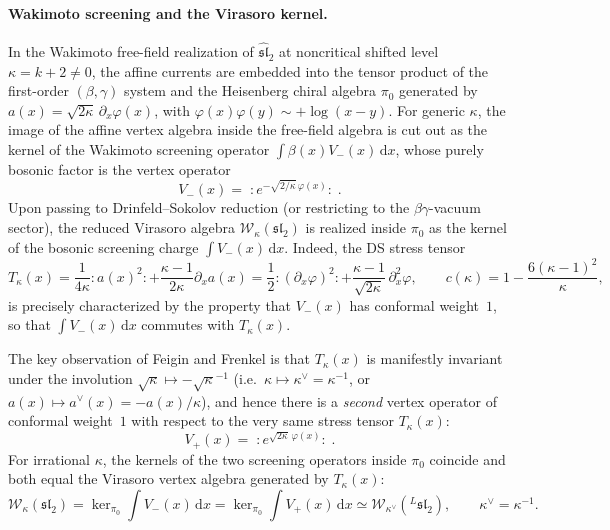 \documentclass[a4paper,11pt]{article}
\newcommand{\dd}{\mathrm{d}}
\numberwithin{equation}{section}
\begin{document}
\paragraph{Wakimoto screening and the Virasoro kernel.}
In the Wakimoto free-field realization of $\widehat{\mathfrak{sl}}_{2}$ at noncritical shifted level $\kappa=k+2\neq 0$, the affine currents are embedded into the tensor product of the first-order $(\beta,\gamma)$ system and the Heisenberg chiral algebra $\pi_{0}$ generated by $a(x)=\sqrt{2\kappa}\,\partial_{x}\varphi(x)$, with $\varphi(x)\varphi(y)\sim +\log(x-y)$. For generic $\kappa$, the image of the affine vertex algebra inside the free-field algebra is cut out as the kernel of the Wakimoto screening operator $\int \beta(x)V_{-}(x)\,\dd x$, whose purely bosonic factor is the vertex operator
\begin{equation}
	\label{equation:PII Frenkel magnetic screening}
	V_{-}(x)=\;:e^{-\sqrt{2/\kappa}\,\varphi(x)}:\;.
\end{equation}
Upon passing to Drinfeld--Sokolov reduction (or restricting to the $\beta\gamma$-vacuum sector), the reduced Virasoro algebra $\mathcal{W}_{\kappa}(\mathfrak{sl}_{2})$ is realized inside $\pi_{0}$ as the kernel of the bosonic screening charge $\int V_{-}(x)\,\dd x$. Indeed, the DS stress tensor
\begin{equation}
	\label{equation:PII Frenkel Virasoro}
	T_{\kappa}(x)
	=\frac{1}{4\kappa}:a(x)^{2}:+\frac{\kappa-1}{2\kappa}\partial_{x}a(x)
	=\frac{1}{2}:(\partial_{x}\varphi)^{2}:+\frac{\kappa-1}{\sqrt{2\kappa}}\,\partial_{x}^{2}\varphi,
	\qquad
	c(\kappa)=1-\frac{6(\kappa-1)^{2}}{\kappa},
\end{equation}
is precisely characterized by the property that $V_{-}(x)$ has conformal weight~$1$, so that $\int V_{-}(x)\,\dd x$ commutes with $T_{\kappa}(x)$.

The key observation of Feigin and Frenkel \cite{FeiginFrenkel1992,Frenkel2005LanglandsLectures} is that $T_{\kappa}(x)$ is manifestly invariant under the involution $\sqrt{\kappa}\mapsto -\sqrt{\kappa}^{-1}$ (i.e.\ $\kappa\mapsto\kappa^{\vee}=\kappa^{-1}$, or $a(x)\mapsto a^{\vee}(x)=-a(x)/\kappa$), and hence there is a \emph{second} vertex operator of conformal weight~$1$ with respect to the very same stress tensor $T_{\kappa}(x)$:
\begin{equation}
	\label{equation:PII Frenkel electric screening}
	V_{+}(x)=\;:e^{\sqrt{2\kappa}\,\varphi(x)}:\;.
\end{equation}
For irrational $\kappa$, the kernels of the two screening operators inside $\pi_{0}$ coincide and both equal the Virasoro vertex algebra generated by $T_{\kappa}(x)$:
\begin{equation}
	\label{equation:PII Frenkel kernel duality}
	\mathcal{W}_{\kappa}(\mathfrak{sl}_{2})
	=\ker_{\pi_{0}}\int V_{-}(x)\,\dd x
	=\ker_{\pi_{0}}\int V_{+}(x)\,\dd x
	\simeq \mathcal{W}_{\kappa^{\vee}}({}^{L}\mathfrak{sl}_{2}),
	\qquad
	\kappa^{\vee}=\kappa^{-1}.
\end{equation}
\end{document}

